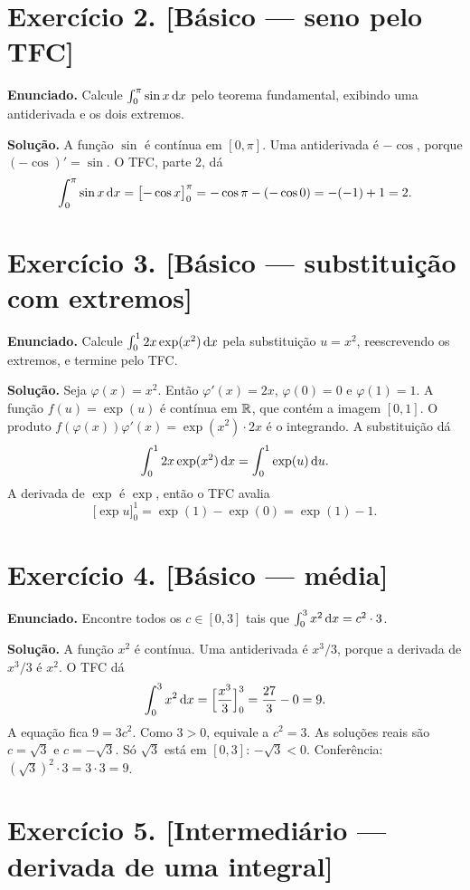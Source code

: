 \documentclass[11pt,a4paper]{article}
\begin{document}
\section*{Exercício 2. [Básico --- seno pelo TFC]}

\textbf{Enunciado.} Calcule $\int_0^{\pi}\sin x\,\mathrm{d} x$ pelo teorema fundamental, exibindo uma antiderivada e os dois extremos.

\textbf{Solução.}
A função $\sin$ é contínua em $[0,\pi]$. Uma antiderivada é $-\cos$, porque $(-\cos)'=\sin$. O TFC, parte 2, dá
\[
\int_0^{\pi}\sin x\,\mathrm{d} x
=\bigl[-\cos x\bigr]_0^{\pi}
=-\cos\pi-(-\cos 0)
=-(-1)+1
=2.
\]

\section*{Exercício 3. [Básico --- substituição com extremos]}

\textbf{Enunciado.} Calcule $\int_0^1 2x\exp(x^2)\,\mathrm{d} x$ pela substituição $u=x^2$, reescrevendo os extremos, e termine pelo TFC.

\textbf{Solução.}
Seja $\varphi(x)=x^2$. Então $\varphi'(x)=2x$, $\varphi(0)=0$ e $\varphi(1)=1$. A função $f(u)=\exp(u)$ é contínua em $\mathbb{R}$, que contém a imagem $[0,1]$. O produto $f(\varphi(x))\varphi'(x)=\exp(x^2)\cdot 2x$ é o integrando. A substituição dá
\[
\int_0^1 2x\exp(x^2)\,\mathrm{d} x=\int_0^1\exp(u)\,\mathrm{d} u.
\]
A derivada de $\exp$ é $\exp$, então o TFC avalia
\[
\bigl[\exp u\bigr]_0^1=\exp(1)-\exp(0)=\exp(1)-1.
\]

\section*{Exercício 4. [Básico --- média]}

\textbf{Enunciado.} Encontre todos os $c\in[0,3]$ tais que $\int_0^3 x^2\,\mathrm{d} x=c^2\cdot 3$.

\textbf{Solução.}
A função $x^2$ é contínua. Uma antiderivada é $x^3/3$, porque a derivada de $x^3/3$ é $x^2$. O TFC dá
\[
\int_0^3 x^2\,\mathrm{d} x=\Bigl[\frac{x^3}{3}\Bigr]_0^3=\frac{27}{3}-0=9.
\]
A equação fica $9=3c^2$. Como $3>0$, equivale a $c^2=3$. As soluções reais são $c=\sqrt{3}$ e $c=-\sqrt{3}$. Só $\sqrt{3}$ está em $[0,3]$: $-\sqrt{3}<0$. Conferência: $(\sqrt{3})^2\cdot 3=3\cdot 3=9$.

\section*{Exercício 5. [Intermediário --- derivada de uma integral]}
\end{document}
